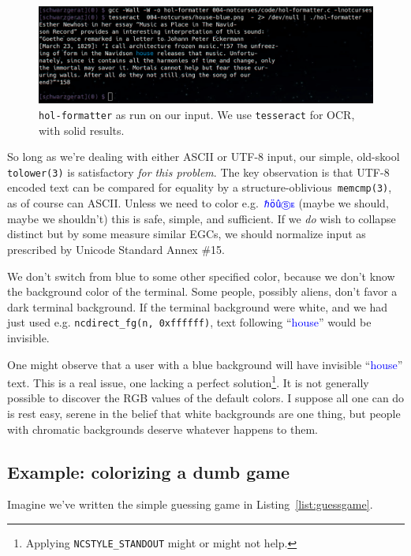 \documentclass[letterpaper,10pt]{article}
\begin{document}
\begin{figure}[!htb]
\centering \includegraphics[width=.75\linewidth]{hol-formatted.png}
\caption[\texttt{hol-formatter} as run on OCRd input.]{\texttt{hol-formatter} as run on our input. We use \texttt{tesseract} for OCR, with solid results.}
\label{fig:houseout}
\end{figure}

So long as we're dealing with either ASCII or UTF-8 input, our simple, old-skool
\texttt{tolower(3)} is satisfactory \textit{for this problem}. The key
observation is that UTF-8 encoded text can be compared for equality by
a structure-oblivious~\texttt{memcmp(3)}, as of course can ASCII.
Unless we need to color e.g.~\textcolor{blue}{\texttt{ℏöûⓈᴇ}} (maybe we should,
maybe we shouldn't) this is safe, simple, and sufficient. If we \textit{do}
wish to collapse distinct but by some measure similar EGCs, we should normalize
input as prescribed by Unicode Standard Annex \#15\cite{annex15}.

We don't switch from blue to some other specified color, because we don't know
the background color of the terminal. Some people, possibly aliens, don't favor
a dark terminal background. If the terminal background were white, and we had
just used e.g. \texttt{ncdirect\_fg(n, 0xffffff)}, text following
``\textcolor{blue}{house}'' would be invisible.

One might observe that a user with a blue background will have invisible
``\textcolor{blue}{house}'' text. This is a real issue, one lacking a perfect
solution\footnote{Applying \texttt{NCSTYLE\_STANDOUT} might or might not help.}.
It is not generally possible to discover the RGB values of the default colors.
I suppose all one can do is rest easy, serene in the belief that white
backgrounds are one thing, but people with chromatic backgrounds deserve
whatever happens to them.

\subsection{Example: colorizing a dumb game}
Imagine we've written the simple guessing game in Listing~\ref{list:guessgame}.
\end{document}
